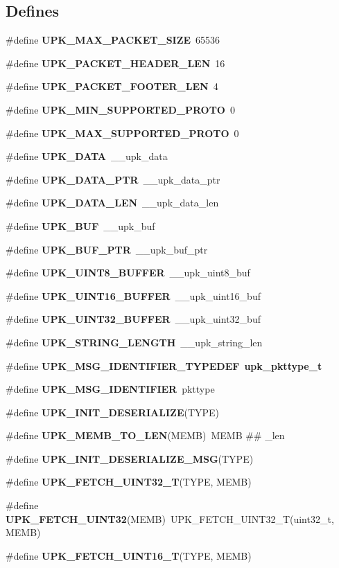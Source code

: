 \subsection*{Defines}
\begin{DoxyCompactItemize}
\item 
\#define {\bf UPK\_\-MAX\_\-PACKET\_\-SIZE}~65536
\item 
\#define {\bf UPK\_\-PACKET\_\-HEADER\_\-LEN}~16
\item 
\#define {\bf UPK\_\-PACKET\_\-FOOTER\_\-LEN}~4
\item 
\#define {\bf UPK\_\-MIN\_\-SUPPORTED\_\-PROTO}~0
\item 
\#define {\bf UPK\_\-MAX\_\-SUPPORTED\_\-PROTO}~0
\item 
\#define {\bf UPK\_\-DATA}~\_\-\_\-upk\_\-data
\item 
\#define {\bf UPK\_\-DATA\_\-PTR}~\_\-\_\-upk\_\-data\_\-ptr
\item 
\#define {\bf UPK\_\-DATA\_\-LEN}~\_\-\_\-upk\_\-data\_\-len
\item 
\#define {\bf UPK\_\-BUF}~\_\-\_\-upk\_\-buf
\item 
\#define {\bf UPK\_\-BUF\_\-PTR}~\_\-\_\-upk\_\-buf\_\-ptr
\item 
\#define {\bf UPK\_\-UINT8\_\-BUFFER}~\_\-\_\-upk\_\-uint8\_\-buf
\item 
\#define {\bf UPK\_\-UINT16\_\-BUFFER}~\_\-\_\-upk\_\-uint16\_\-buf
\item 
\#define {\bf UPK\_\-UINT32\_\-BUFFER}~\_\-\_\-upk\_\-uint32\_\-buf
\item 
\#define {\bf UPK\_\-STRING\_\-LENGTH}~\_\-\_\-upk\_\-string\_\-len
\item 
\#define {\bf UPK\_\-MSG\_\-IDENTIFIER\_\-TYPEDEF}~{\bf upk\_\-pkttype\_\-t}
\item 
\#define {\bf UPK\_\-MSG\_\-IDENTIFIER}~pkttype
\item 
\#define {\bf UPK\_\-INIT\_\-DESERIALIZE}(TYPE)
\item 
\#define {\bf UPK\_\-MEMB\_\-TO\_\-LEN}(MEMB)~MEMB \#\# \_\-len
\item 
\#define {\bf UPK\_\-INIT\_\-DESERIALIZE\_\-MSG}(TYPE)
\item 
\#define {\bf UPK\_\-FETCH\_\-UINT32\_\-T}(TYPE, MEMB)
\item 
\#define {\bf UPK\_\-FETCH\_\-UINT32}(MEMB)~UPK\_\-FETCH\_\-UINT32\_\-T(uint32\_\-t, MEMB)
\item 
\#define {\bf UPK\_\-FETCH\_\-UINT16\_\-T}(TYPE, MEMB)
\item 

\end{DoxyCompactItemize}
